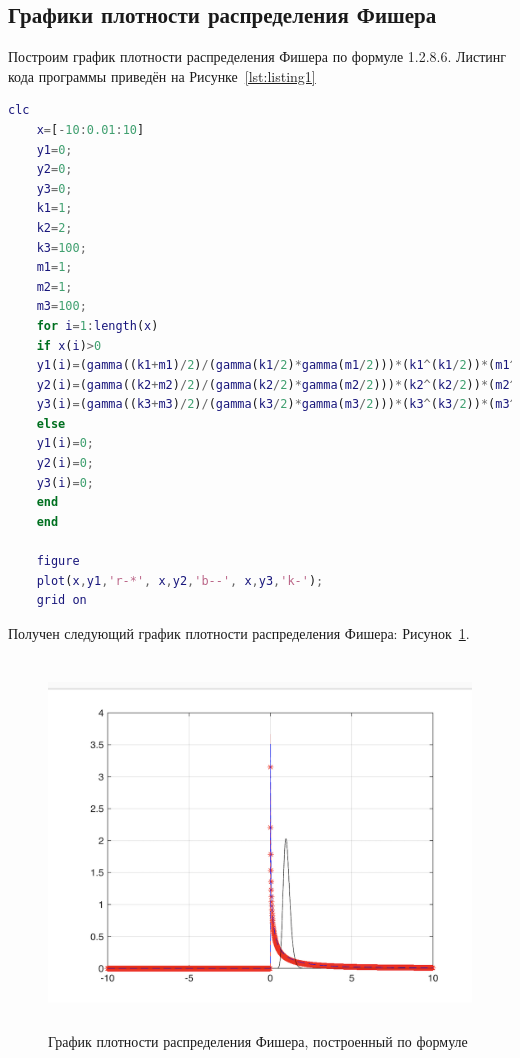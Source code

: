 \documentclass[a4paper,hidelinks,14pt]{extarticle}
\begin{document}
\subsection{Графики плотности распределения Фишера}
Построим график плотности распределения Фишера по формуле 1.2.8.6. Листинг кода программы приведён на Рисунке~\ref{lst:listing1}
\begin{lstlisting}[language=matlab,caption=Код программы \textit{Matlab}, label={lst:listing1}]
    clc
    x=[-10:0.01:10]
    y1=0;
    y2=0;
    y3=0;
    k1=1;
    k2=2;
    k3=100;
    m1=1;
    m2=1;
    m3=100;
    for i=1:length(x)
    if x(i)>0
    y1(i)=(gamma((k1+m1)/2)/(gamma(k1/2)*gamma(m1/2)))*(k1^(k1/2))*(m1^(m1/2))*(x(i)^((m1/2)-1))/((k1+m1*x(i))^((k1+m1)/2));
    y2(i)=(gamma((k2+m2)/2)/(gamma(k2/2)*gamma(m2/2)))*(k2^(k2/2))*(m2^(m2/2))*(x(i)^((m2/2)-1))/((k2+m2*x(i))^((k2+m2)/2));
    y3(i)=(gamma((k3+m3)/2)/(gamma(k3/2)*gamma(m3/2)))*(k3^(k3/2))*(m3^(m3/2))*(x(i)^((m3/2)-1))/((k3+m3*x(i))^((k3+m3)/2));
    else
    y1(i)=0;
    y2(i)=0;
    y3(i)=0;
    end
    end

    figure
    plot(x,y1,'r-*', x,y2,'b--', x,y3,'k-');
    grid on

\end{lstlisting}

Получен следующий график плотности распределения Фишера: Рисунок~\ref{fig:fig3}.

\begin{figure}[htbp]
    \centering
    \includegraphics[width=150mm,height=98mm,scale=0.7]{fig/raspr2.png}
    \caption{График плотности распределения Фишера, построенный по формуле}
    \label{fig:fig3}
\end{figure}
\end{document}
